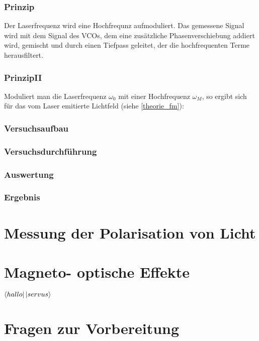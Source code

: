 \documentclass[a4paper,oneside]{article}
\begin{document}
\subsubsection{Prinzip}
Der Laserfrequenz wird eine Hochfrequnz aufmoduliert. Das gemessene Signal wird mit dem Signal des VCOs, dem eine zusätzliche Phasenverschiebung addiert wird, gemischt und durch einen Tiefpass geleitet, der die hochfrequenten Terme herausfiltert.

\subsubsection{PrinzipII}
Moduliert man die Laserfrequenz $\omega_0$ mit einer Hochfrequenz $\omega_M$, so ergibt sich für das vom Laser emitierte Lichtfeld (siehe \ref{theorie_fm}):

\subsubsection{Versuchsaufbau}
\subsubsection{Versuchsdurchführung}
\subsubsection{Auswertung}
\subsubsection{Ergebnis}


\section{Messung der Polarisation von Licht}

\section{Magneto- optische Effekte}


$\bra{hallo}
\ket{servus}$





\clearpage
\appendix
\section{Fragen zur Vorbereitung}
\end{document}
